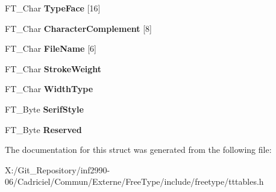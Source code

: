 \begin{DoxyCompactItemize}
\item 
\hypertarget{struct_t_t___p_c_l_t___a47c2c6b276f3ab2002fe03af41dad396}{F\-T\-\_\-\-Char {\bfseries Type\-Face} \mbox{[}16\mbox{]}}\label{struct_t_t___p_c_l_t___a47c2c6b276f3ab2002fe03af41dad396}

\item 
\hypertarget{struct_t_t___p_c_l_t___a2641686beb550bcf8d9e598336f0acd9}{F\-T\-\_\-\-Char {\bfseries Character\-Complement} \mbox{[}8\mbox{]}}\label{struct_t_t___p_c_l_t___a2641686beb550bcf8d9e598336f0acd9}

\item 
\hypertarget{struct_t_t___p_c_l_t___a87691bde7cb06e3043f5320c8223e768}{F\-T\-\_\-\-Char {\bfseries File\-Name} \mbox{[}6\mbox{]}}\label{struct_t_t___p_c_l_t___a87691bde7cb06e3043f5320c8223e768}

\item 
\hypertarget{struct_t_t___p_c_l_t___aaf28b05ac07bcdc1ae6f4ec9064434fc}{F\-T\-\_\-\-Char {\bfseries Stroke\-Weight}}\label{struct_t_t___p_c_l_t___aaf28b05ac07bcdc1ae6f4ec9064434fc}

\item 
\hypertarget{struct_t_t___p_c_l_t___ad6613ad7556599343f999a7d27a0f1d0}{F\-T\-\_\-\-Char {\bfseries Width\-Type}}\label{struct_t_t___p_c_l_t___ad6613ad7556599343f999a7d27a0f1d0}

\item 
\hypertarget{struct_t_t___p_c_l_t___aa8e3d35937660a1e4959ee10a4800e6a}{F\-T\-\_\-\-Byte {\bfseries Serif\-Style}}\label{struct_t_t___p_c_l_t___aa8e3d35937660a1e4959ee10a4800e6a}

\item 
\hypertarget{struct_t_t___p_c_l_t___a2e46e3f5eaa51e02d831d3f6143f8846}{F\-T\-\_\-\-Byte {\bfseries Reserved}}\label{struct_t_t___p_c_l_t___a2e46e3f5eaa51e02d831d3f6143f8846}

\end{DoxyCompactItemize}


The documentation for this struct was generated from the following file\-:\begin{DoxyCompactItemize}
\item 
X\-:/\-Git\-\_\-\-Repository/inf2990-\/06/\-Cadriciel/\-Commun/\-Externe/\-Free\-Type/include/freetype/tttables.\-h\end{DoxyCompactItemize}
